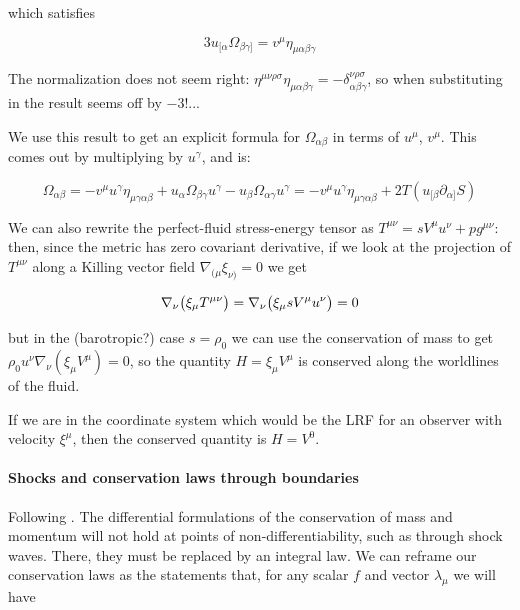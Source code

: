\documentclass[main.tex]{subfiles}
\begin{document}
which satisfies

\begin{equation}
  3 u_{[\alpha} \Omega_{\beta \gamma]} = v^{\mu} \eta_{\mu \alpha \beta \gamma}
\end{equation}

\begin{greenbox}
  The normalization does not seem right: \(\eta^{\mu\nu\rho\sigma} \eta_{\mu\alpha\beta\gamma} = -\delta^{\nu\rho\sigma}_{\alpha\beta\gamma}\), so when substituting in the result seems off by \(- 3!\)...
\end{greenbox}

We use this result to get an explicit formula for \(\Omega_{\alpha\beta}\) in terms of \(u^\mu\), \(v^\mu\).
This comes out by multiplying by \(u^\gamma\), and is:

\begin{equation}
  \Omega _{\alpha\beta}
  = - v^\mu u^\gamma \eta_{\mu\gamma\alpha\beta} + u_\alpha \Omega_{\beta\gamma} u^\gamma - u_\beta \Omega_{\alpha\gamma} u^\gamma
  = - v^\mu u^\gamma \eta_{\mu\gamma\alpha\beta} + 2T (u_{[\beta} \partial_{\alpha]} S )
\end{equation}

We can also rewrite the perfect-fluid stress-energy tensor as \(T^{\mu\nu} = s V^\mu u^\nu +p g^{\mu\nu}\): then, since the metric has zero covariant derivative, if we look at the projection of \(T^{\mu\nu}\) along a Killing vector field \(\nabla_{(\mu} \xi_{\nu)}=0\) we get

\begin{equation}
  \nabla_\nu \qty(\xi_\mu T^{\mu\nu}) = \nabla_\nu \qty(\xi_\mu s V^\mu u^\nu) = 0
\end{equation}

but in the (barotropic?) case \(s = \rho_0\) we can use the conservation of mass to get \(\rho_0 u^\nu \nabla_\nu (\xi_\mu V^\mu) = 0\), so the quantity \(H = \xi_\mu V^\mu\) is conserved along the worldlines of the fluid.

If we are in the coordinate system which would be the LRF for an observer with velocity \(\xi^\mu\), then the conserved quantity is \(H = V^0 \).

\paragraph{Shocks and conservation laws through boundaries}

Following \cite[section 13]{Taub:1978}.
The differential formulations of the conservation of mass and momentum will not hold at points of non-differentiability, such as through shock waves.
There, they must be replaced by an integral law.
We can reframe our conservation laws as the statements that, for any scalar \(f\) and vector \(\lambda_\mu\) we will have
\end{document}

